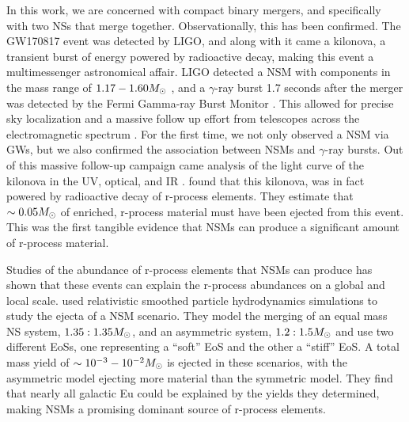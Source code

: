 \documentclass[fleqn,usenatbib]{mnras}
\begin{document}
In this work, we are concerned with compact binary mergers, and specifically with two NSs that merge together. Observationally, this has been confirmed. The GW170817 event was detected by LIGO, and along with it came a kilonova, a transient burst of energy powered by radioactive decay, making this event a multimessenger astronomical affair. LIGO detected a NSM with components in the mass range of $1.17 - 1.60 \Ms$ \citep{Abbott17}, and a $\gamma$-ray burst 1.7 seconds after the merger was detected by the Fermi Gamma-ray Burst Monitor \citep{Goldstein17}. This allowed for precise sky localization and a massive follow up effort from telescopes across the electromagnetic spectrum \citep[see][for an extensive review of this follow-up]{Abbott17a}. For the first time, we not only observed a NSM via GWs, but we also confirmed the association between NSMs and $\gamma$-ray bursts. Out of this massive follow-up campaign came analysis of the light curve of the kilonova in the UV, optical, and IR \citep{Drout17, Pian17}. \citet{Drout17} found that this kilonova, was in fact powered by radioactive decay of r-process elements. They estimate that $\sim 0.05 \Ms$ of enriched, r-process material must have been ejected from this event. This was the first tangible evidence that NSMs can produce a significant amount of r-process material.

Studies of the abundance of r-process elements that NSMs can produce has shown that these events can explain the r-process abundances on a global and local scale. \citet{Goriely11} used relativistic smoothed particle hydrodynamics simulations to study the ejecta of a NSM scenario. They model the merging of an equal mass NS system, $1.35:1.35 \Ms$, and an asymmetric system, $1.2:1.5 \Ms$ and use two different EoSs, one representing a ``soft'' EoS and the other a ``stiff'' EoS. A total mass yield of $\sim 10^{-3} - 10^{-2} \Ms$ is ejected in these scenarios, with the asymmetric model ejecting more material than the symmetric model. They find that nearly all galactic Eu could be explained by the yields they determined, making NSMs a promising dominant source of r-process elements. 
\end{document}
